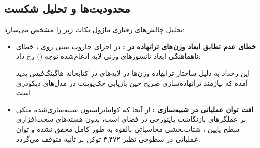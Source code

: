 \subsection{محدودیت‌ها و تحلیل شکست}
تحلیل چالش‌های رفتاری ماژول نکات زیر را مشخص می‌سازد:
\begin{itemize}
    \item \textbf{خطای عدم تطابق ابعاد وزن‌های ترانهاده در :} در اجرای جاروب متنی  روی ، خطای ناهماهنگی ابعاد تانسورهای وزنی لایه ادغام‌شده توجه () رخ داد:
    \begin{quote}
    \end{quote}
    این رخداد به دلیل ساختار ترانهاده وزن‌ها در لایه‌های  در کتابخانه هاگینگ‌فیس پدید آمده که نیازمند ترانهاده‌سازی صریح حین بازیابی چک‌پوینت در مدل‌های دیکودری است.
    \item \textbf{افت توان عملیاتی در شبیه‌سازی :} از آنجا که کوانتایزاسیون شبیه‌سازی‌شده متکی بر عملگرهای بازنگاشت پایتورچی در فضای  است، بدون هسته‌های سخت‌افزاری سطح پایین ، شتاب‌بخشی محاسباتی بالقوه به طور کامل محقق نشده و توان عملیاتی در سطوحی نظیر ۴,۴۷۲ توکن بر ثانیه متوقف می‌گردد.
\end{itemize}
